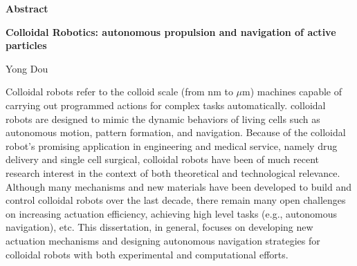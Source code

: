 

\begin{titlepage}
\begin{center}

\vspace*{1\baselineskip}
\textbf{\huge Abstract}

\textbf{Colloidal Robotics: autonomous propulsion and navigation of active particles}

Yong Dou
\end{center}

\hspace{5mm}Colloidal robots refer to the colloid scale (from nm to $\mu$m) machines capable of carrying out programmed actions for complex tasks automatically.   colloidal robots are designed to mimic the dynamic behaviors of living cells such as autonomous motion, pattern formation, and navigation. Because of the colloidal robot's promising application in engineering and medical service, namely drug delivery and single cell surgical, colloidal robots have been of much recent research interest in the context of both theoretical and technological relevance. Although many mechanisms and new materials have been developed to build and control colloidal robots over the last decade, there remain many open challenges on increasing actuation efficiency, achieving high level tasks (e.g., autonomous navigation), etc. This dissertation, in general, focuses on developing new actuation mechanisms and designing  autonomous navigation strategies for colloidal robots with both experimental and computational efforts.


\end{titlepage}
